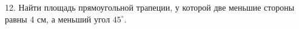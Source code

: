 12. Найти площадь прямоугольной трапеции, у которой две меньшие стороны равны 4 см, а меньший угол $45^\circ.$\\
